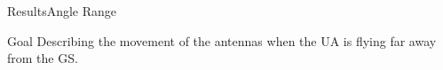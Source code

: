 \begin{frame}{Results}{Angle Range}

  \begin{block}{Goal}
	Describing the movement of the antennas when the UA is flying far away from the GS. 
  \end{block}

  \begin{figure}[H]
    \centerline{
    }
  \end{figure}

\end{frame}




